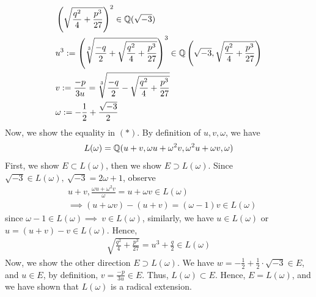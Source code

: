 \documentclass{article}
\begin{document}
\begin{homeworkProblem}
\begin{align}
        & \left( \sqrt{\frac{ q^2 }{ 4 }+\frac{ p^3 }{ 27 }} \right)^2 \in \mathbb{Q}(\sqrt{-3}) \\
        & u^3 := \left( \sqrt[3]{\frac{ -q }{ 2 } + \sqrt{\frac{ q^2 }{ 4 }+\frac{ p^3 }{ 27 }} } \right)^3 \in \mathbb{Q} \left(\sqrt{-3}, \sqrt{\frac{ q^2 }{ 4 }+\frac{ p^3 }{ 27 }} \right) \\
        & v := \frac{ -p }{ 3u } = \sqrt[3]{\frac{ -q }{ 2 } - \sqrt{\frac{ q^2 }{ 4 }+\frac{ p^3 }{ 27 }} }\\
        & \omega := - \frac{ 1 }{ 2 } + \frac{ \sqrt{-3} }{ 2 }
    \end{align}
    Now, we show the equality in $(*)$. By definition of $u,v,\omega$, we have
    \begin{align}
        L(\omega) = \mathbb{Q} (u+v, \omega u + \omega^2 v, \omega^2 u + \omega v, \omega)
    \end{align}
    First, we show $E \subset L(\omega)$, then we show $E \supset L(\omega)$.
    Since $\sqrt{-3} \in L(\omega), \ \sqrt{-3} = 2 \omega + 1$, observe
    \begin{align}
        & u+v, \frac{ \omega u + \omega^2 v }{ \omega } = u + \omega v \in L(\omega)\\
        & \implies (u + \omega v) - (u + v) = (\omega -1)v \in L(\omega)
    \end{align}
    since $\omega - 1 \in L(\omega) \implies \ v \in L(\omega)$, similarly, we have $u \in L(\omega)$ or $u = (u+v) - v \in L(\omega)$. 
    Hence, 
    \begin{align}
    \sqrt{ \frac{ q^2 }{ 4 } + \frac{ p^3 }{ 27 } }= u^3 + \frac{ q }{ 2 }  \in L(\omega)
    \end{align}
    Now, we show the other direction $E \supset L(\omega)$.
    We have $w = - \frac{ 1 }{ 2 } + \frac{ 1 }{ 2 }\cdot \sqrt{-3} \in E$,
    and $u \in E$, by definition, $v = \frac{ -p }{ 3u } \in E$.
    Thus, $L(\omega) \subset E$. Hence, $E = L(\omega)$, 
    and we have shown that $L(\omega)$ is a radical extension.
    



\end{homeworkProblem}

\pagebreak
\end{document}
